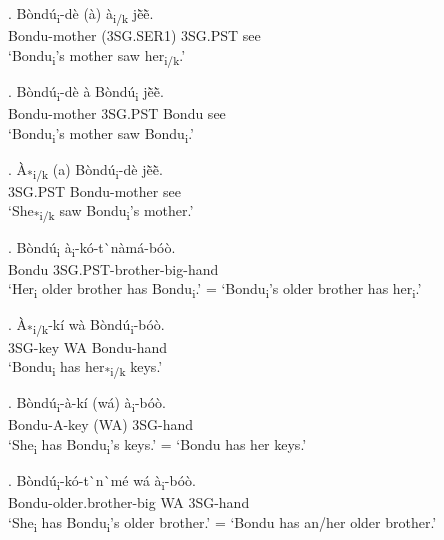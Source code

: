 \documentclass{assets/fieldnotes}
\begin{document}
\exg. B\`{o}nd\'{u}\textsubscript{i}-d\`{e} (\`{a}) \`{a}\textsubscript{i/k} jẽ̀ẽ̀. \\
Bondu-mother (3SG.SER1) 3SG.PST see \\
`Bondu\textsubscript{i}'s mother saw her\textsubscript{i/k}.'

\exg. B\`{o}nd\'{u}\textsubscript{i}-d\`{e} \`{a} B\`{o}nd\'{u}\textsubscript{i} jẽ̀ẽ̀. \\
Bondu-mother 3SG.PST Bondu see \\
`Bondu\textsubscript{i}'s mother saw Bondu\textsubscript{i}.' 

\exg. \`{A}\textsubscript{*i/k} (a) B\`{o}nd\'{u}\textsubscript{i}-d\`{e} jẽ̀ẽ̀. \\
3SG.PST Bondu-mother see \\
`She\textsubscript{*i/k} saw Bondu\textsubscript{i}'s mother.' 

\exg. B\`{o}nd\'{u}\textsubscript{i} \`{a}\textsubscript{i}-k\'{o}-t\`{}n\`{a}m\'{a}-b\'{o}\`{o}. \\
Bondu 3SG.PST-brother-big-hand \\
`Her\textsubscript{i} older brother has Bondu\textsubscript{i}.' = `Bondu\textsubscript{i}'s older brother has her\textsubscript{i}.' 



\exg. \`{A}\textsubscript{*i/k}-k\'{i} w\`{a} B\`{o}nd\'{u}\textsubscript{i}-b\'{o}\`{o}. \\
3SG-key WA Bondu-hand \\
`Bondu\textsubscript{i} has her\textsubscript{*i/k} keys.' 

\exg. B\`{o}nd\'{u}\textsubscript{i}-\`{a}-k\'{i} (w\'{a}) \`{a}\textsubscript{i}-b\'{o}\`{o}. \\
Bondu-A-key (WA) 3SG-hand \\
`She\textsubscript{i} has Bondu\textsubscript{i}'s keys.' 
= `Bondu has her keys.'  

\exg. B\`{o}nd\'{u}\textsubscript{i}-k\'{o}-t\`{}n\`{}m\'{e} w\'{a} \`{a}\textsubscript{i}-b\'{o}\`{o}. \\
Bondu-older.brother-big WA 3SG-hand \\
`She\textsubscript{i} has Bondu\textsubscript{i}'s older brother.' = `Bondu has an/her older brother.'
\end{document}
